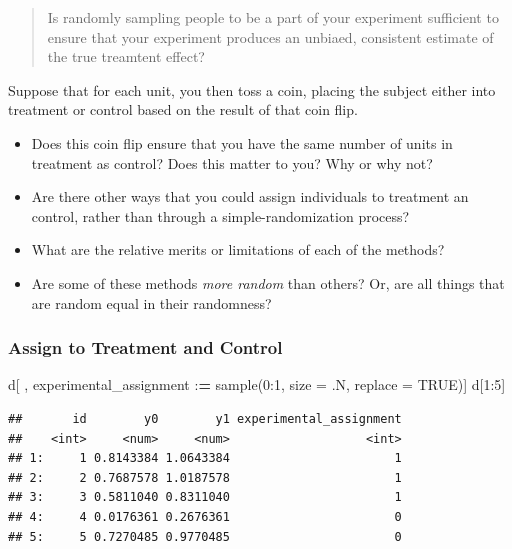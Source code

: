 \documentclass[
]{article}
\newenvironment{Shaded}{\begin{snugshade}}{\end{snugshade}}
\newcommand{\AttributeTok}[1]{\textcolor[rgb]{0.77,0.63,0.00}{#1}}
\newcommand{\ConstantTok}[1]{\textcolor[rgb]{0.00,0.00,0.00}{#1}}
\newcommand{\DecValTok}[1]{\textcolor[rgb]{0.00,0.00,0.81}{#1}}
\newcommand{\ErrorTok}[1]{\textcolor[rgb]{0.64,0.00,0.00}{\textbf{#1}}}
\newcommand{\FunctionTok}[1]{\textcolor[rgb]{0.00,0.00,0.00}{#1}}
\newcommand{\NormalTok}[1]{#1}
\newcommand{\SpecialCharTok}[1]{\textcolor[rgb]{0.00,0.00,0.00}{#1}}
\providecommand{\tightlist}{%
  \setlength{\itemsep}{0pt}\setlength{\parskip}{0pt}}
\begin{document}
\begin{quote}
Is randomly sampling people to be a part of your experiment sufficient to ensure that your experiment produces an unbiaed, consistent estimate of the true treamtent effect?
\end{quote}

Suppose that for each unit, you then toss a coin, placing the subject either into treatment or control based on the result of that coin flip.

\begin{itemize}
\tightlist
\item
  Does this coin flip ensure that you have the same number of units in treatment as control? Does this matter to you? Why or why not?
\item
  Are there other ways that you could assign individuals to treatment an control, rather than through a simple-randomization process?
\item
  What are the relative merits or limitations of each of the methods?
\item
  Are some of these methods \emph{more random} than others? Or, are all things that are random equal in their randomness?
\end{itemize}

\hypertarget{assign-to-treatment-and-control}{%
\subsubsection{Assign to Treatment and Control}\label{assign-to-treatment-and-control}}

\begin{Shaded}
\begin{Highlighting}[]
\NormalTok{d[ , experimental\_assignment }\SpecialCharTok{:}\ErrorTok{=} \FunctionTok{sample}\NormalTok{(}\DecValTok{0}\SpecialCharTok{:}\DecValTok{1}\NormalTok{, }\AttributeTok{size =}\NormalTok{ .N, }\AttributeTok{replace =} \ConstantTok{TRUE}\NormalTok{)]}
\NormalTok{d[}\DecValTok{1}\SpecialCharTok{:}\DecValTok{5}\NormalTok{]}
\end{Highlighting}
\end{Shaded}

\begin{verbatim}
##       id        y0        y1 experimental_assignment
##    <int>     <num>     <num>                   <int>
## 1:     1 0.8143384 1.0643384                       1
## 2:     2 0.7687578 1.0187578                       1
## 3:     3 0.5811040 0.8311040                       1
## 4:     4 0.0176361 0.2676361                       0
## 5:     5 0.7270485 0.9770485                       0
\end{verbatim}
\end{document}

